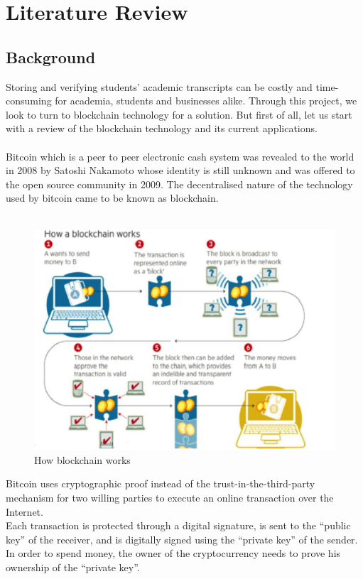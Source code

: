 \chapter{Literature Review}

\section{Background}

Storing and verifying students' academic transcripts can be costly and time-consuming for academia, students and businesses alike. Through this project, we look to turn to blockchain technology for a solution. But first of all, let us start with a review of the blockchain technology and its current applications.\\\\
Bitcoin which is a peer to peer electronic cash system was revealed to the world in 2008 by Satoshi Nakamoto whose identity is still unknown and was offered to the open source community in 2009. The decentralised nature of the technology used by bitcoin came to be known as blockchain.\\\\
\begin{figure}[!h]
\centering
\includegraphics[scale=0.3]{images/howitworks.jpg}
\caption{How blockchain works}
\end{figure}
Bitcoin uses cryptographic proof instead of the trust-in-the-third-party mechanism for two willing parties to execute an online transaction over the Internet.\\
Each transaction is protected through a digital signature, is sent to the “public key” of the receiver, and is digitally signed using the “private key” of the sender. In order to spend money, the owner of the cryptocurrency needs to prove his ownership of the “private key”.\\
